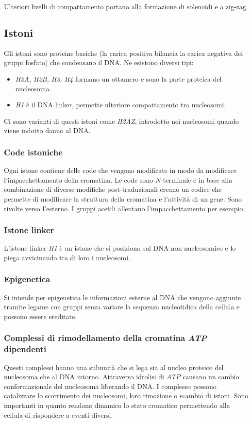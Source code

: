 		Ulteriori livelli di compattamento portano alla formazione di solenoidi e a zig-zag.

	\subsection{Istoni}
	Gli istoni sono proteine basiche (la carica positiva bilancia la carica negativa dei gruppi fosfato) che condensano il DNA.
	Ne esistono diversi tipi:
	\begin{itemize}
		\item \emph{H2A, H2B, H3, H4} formano un ottamero e sono la parte proteica del nucleosoma.
		\item \emph{H1} \`e il DNA linker, permette ulteriore compattamento tra nucleosomi.
	\end{itemize}
	Ci sono varianti di questi istoni come \emph{H2AZ}, introdotto nei nucleosomi quando viene indotto danno al DNA.
		
		\subsubsection{Code istoniche}
		Ogni istone contiene delle code che vengono modificate in modo da modificare l'impacchettamento della cromatina.
		Le code sono $N$-terminale e in base alla combinazione di diverse modifiche post-traduzionali creano un codice che permette di modificare la struttura della cromatina e l'attivit\`a di un gene.
		Sono rivolte verso l'esterno.
		I gruppi acetili allentano l'impacchettamento per esempio.

		\subsubsection{Istone linker}
		L'istone linker \emph{H1} \`e un istone che si posiziona sul DNA non nucleosomico e lo piega avvicinando tra di loro i nucleosomi.

		\subsubsection{Epigenetica}
		Si intende per epigenetica le informazioni esterne al DNA che vengono aggiunte tramite legame con gruppi senza variare la sequenza nucleotidica della cellula e possono essere ereditate.

		\subsubsection{Complessi di rimodellamento della cromatina \emph{ATP} dipendenti}
		Questi complessi hanno una subunit\`a che si lega sia al nucleo proteico del nucleosoma che al DNA intorno.
		Attraverso idrolisi di \emph{ATP} causano un cambio conformazionale del nucleosoma liberando il DNA.
		I complesso possono catalizzare lo scorrimento dei nucleosomi, loro rimozione o scambio di istoni.
		Sono importanti in quanto rendono dinamico lo stato cromatico permettendo alla cellula di rispondere a eventi diversi.

